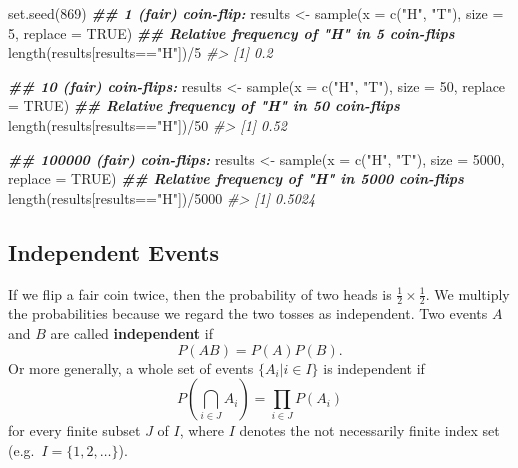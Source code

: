 \documentclass[
  14pt,
]{memoir}
\newenvironment{Shaded}{\begin{snugshade}}{\end{snugshade}}
\newcommand{\AttributeTok}[1]{\textcolor[rgb]{0.77,0.63,0.00}{#1}}
\newcommand{\CommentTok}[1]{\textcolor[rgb]{0.56,0.35,0.01}{\textit{#1}}}
\newcommand{\ConstantTok}[1]{\textcolor[rgb]{0.00,0.00,0.00}{#1}}
\newcommand{\DecValTok}[1]{\textcolor[rgb]{0.00,0.00,0.81}{#1}}
\newcommand{\DocumentationTok}[1]{\textcolor[rgb]{0.56,0.35,0.01}{\textbf{\textit{#1}}}}
\newcommand{\FunctionTok}[1]{\textcolor[rgb]{0.00,0.00,0.00}{#1}}
\newcommand{\NormalTok}[1]{#1}
\newcommand{\OtherTok}[1]{\textcolor[rgb]{0.56,0.35,0.01}{#1}}
\newcommand{\SpecialCharTok}[1]{\textcolor[rgb]{0.00,0.00,0.00}{#1}}
\newcommand{\StringTok}[1]{\textcolor[rgb]{0.31,0.60,0.02}{#1}}
\begin{document}
\begin{Shaded}
\begin{Highlighting}[]
\FunctionTok{set.seed}\NormalTok{(}\DecValTok{869}\NormalTok{)}
\DocumentationTok{\#\# 1 (fair) coin{-}flip:}
\NormalTok{results }\OtherTok{\textless{}{-}} \FunctionTok{sample}\NormalTok{(}\AttributeTok{x =} \FunctionTok{c}\NormalTok{(}\StringTok{"H"}\NormalTok{, }\StringTok{"T"}\NormalTok{), }\AttributeTok{size =} \DecValTok{5}\NormalTok{, }\AttributeTok{replace =} \ConstantTok{TRUE}\NormalTok{)}
\DocumentationTok{\#\# Relative frequency of "H" in 5 coin{-}flips}
\FunctionTok{length}\NormalTok{(results[results}\SpecialCharTok{==}\StringTok{"H"}\NormalTok{])}\SpecialCharTok{/}\DecValTok{5}
\CommentTok{\#\textgreater{} [1] 0.2}

\DocumentationTok{\#\# 10 (fair) coin{-}flips:}
\NormalTok{results }\OtherTok{\textless{}{-}} \FunctionTok{sample}\NormalTok{(}\AttributeTok{x =} \FunctionTok{c}\NormalTok{(}\StringTok{"H"}\NormalTok{, }\StringTok{"T"}\NormalTok{), }\AttributeTok{size =} \DecValTok{50}\NormalTok{, }\AttributeTok{replace =} \ConstantTok{TRUE}\NormalTok{)}
\DocumentationTok{\#\# Relative frequency of "H" in 50 coin{-}flips}
\FunctionTok{length}\NormalTok{(results[results}\SpecialCharTok{==}\StringTok{"H"}\NormalTok{])}\SpecialCharTok{/}\DecValTok{50}
\CommentTok{\#\textgreater{} [1] 0.52}

\DocumentationTok{\#\# 100000 (fair) coin{-}flips:}
\NormalTok{results }\OtherTok{\textless{}{-}} \FunctionTok{sample}\NormalTok{(}\AttributeTok{x =} \FunctionTok{c}\NormalTok{(}\StringTok{"H"}\NormalTok{, }\StringTok{"T"}\NormalTok{), }\AttributeTok{size =} \DecValTok{5000}\NormalTok{, }\AttributeTok{replace =} \ConstantTok{TRUE}\NormalTok{)}
\DocumentationTok{\#\# Relative frequency of "H" in 5000 coin{-}flips}
\FunctionTok{length}\NormalTok{(results[results}\SpecialCharTok{==}\StringTok{"H"}\NormalTok{])}\SpecialCharTok{/}\DecValTok{5000}
\CommentTok{\#\textgreater{} [1] 0.5024}
\end{Highlighting}
\end{Shaded}

\hypertarget{independent-events}{%
\subsection{Independent Events}\label{independent-events}}

If we flip a fair coin twice, then the probability of two heads is \(\frac{1}{2} \times \frac{1}{2}\). We multiply the probabilities because we regard the two tosses as independent. Two events \(A\) and \(B\) are called \textbf{independent} if
\[P(A B)=P(A) P(B).\]
Or more generally, a whole set of events \(\{A_i|i\in I\}\) is independent if
\[
P\left(\bigcap_{i \in J} A_{i}\right)=\prod_{i \in J}P\left(A_{i}\right)
\]
for every finite subset \(J\) of \(I\), where \(I\) denotes the not necessarily finite index set (e.g.~\(I=\{1,2,\dots\}\)).
\end{document}
